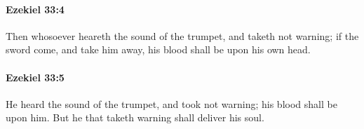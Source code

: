 		\paragraph{Ezekiel 33:4} %
			\label{EZEKIEL-33-4}

			Then whosoever heareth the sound of the trumpet, and taketh not warning; if the sword come, and take him away, his blood shall be upon his own head.


		\paragraph{Ezekiel 33:5} %
			\label{EZEKIEL-33-5}

			He heard the sound of the trumpet, and took not warning; his blood shall be upon him. But he that taketh warning shall deliver his soul.



